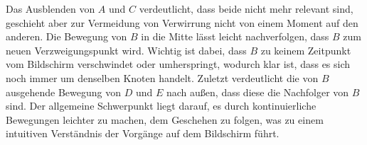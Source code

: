 Das Ausblenden von $A$ und $C$ verdeutlicht, dass beide nicht mehr relevant sind, geschieht aber zur Vermeidung von Verwirrung nicht von einem Moment auf den anderen. Die Bewegung von $B$ in die Mitte lässt leicht nachverfolgen, dass $B$ zum neuen Verzweigungspunkt wird. Wichtig ist dabei, dass $B$ zu keinem Zeitpunkt vom Bildschirm verschwindet oder umherspringt, wodurch klar ist, dass es sich noch immer um denselben Knoten handelt. Zuletzt verdeutlicht die von $B$ ausgehende Bewegung von $D$ und $E$ nach außen, dass diese die Nachfolger von $B$ sind. Der allgemeine Schwerpunkt liegt darauf, es durch kontinuierliche Bewegungen leichter zu machen, dem Geschehen zu folgen, was zu einem intuitiven Verständnis der Vorgänge auf dem Bildschirm führt.



























































